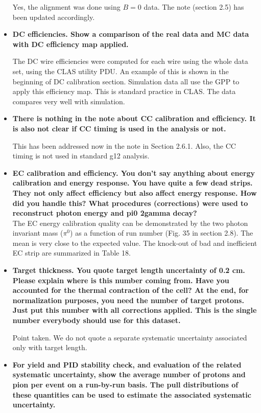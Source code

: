\documentclass[ 12 pt]{article}
\begin{document}
\begin{itemize}
Yes, the alignment was done using $B=0$ data. The note (section 2.5) has been updated accordingly.

\item \textbf{DC efficiencies. Show a comparison of the real data and MC data with DC efficiency map applied.}

The DC wire efficiencies were computed for each wire using the whole data set, using the CLAS utility PDU. An example of this is shown in the beginning of DC calibration section. Simulation data all use the GPP to apply this efficiency map. This is standard practice in CLAS. The data compares very well with simulation. 

\item \textbf{There is nothing in the note about CC calibration and efficiency. It is also not clear if CC timing is used in the analysis or not.}

This has been addressed now in the note in Section 2.6.1. Also, the CC timing is not used in standard g12 analysis.


\item \textbf{EC calibration and efficiency. You don't say anything about energy calibration 
and energy response. You have quite a few dead strips. They not only affect 
efficiency but also affect energy response. How did you handle this? What 
procedures (corrections) were used to reconstruct photon energy and pi0 
2gamma decay?}\\


The EC energy calibration quality can be demonstrated by the two photon invariant mass ($\pi^0$) as a function of run number (Fig. 35 in section 2.8). The mean is very close to the expected value. The knock-out of bad and inefficient EC strip are summarized in Table 18. 

\item \textbf{Target thickness. You quote target length uncertainty of 0.2 cm. Please 
explain where is this number coming from. Have you accounted for the 
thermal contraction of the cell? At the end, for normalization purposes, you 
need the number of target protons. Just put this number with all corrections 
applied. This is the single number everybody should use for this dataset.}

Point taken. We do not quote a separate systematic uncertainty associated only with target length.


\item \textbf{For yield and PID stability check, and evaluation of the related systematic 
uncertainty, show the average number of protons and pion per event on a
run-by-run basis. The pull distributions of these quantities can be used to 
estimate the associated systematic uncertainty.}


\end{itemize}
\end{document}
